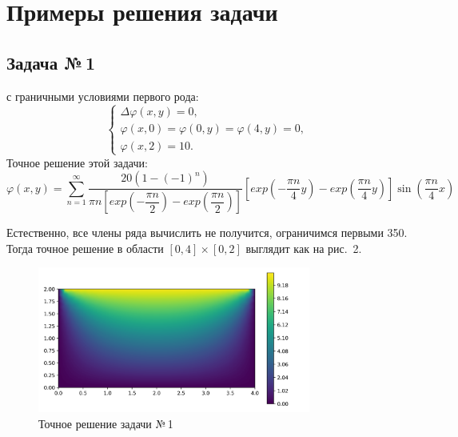 \documentclass[12pt, a4paper]{article}
\begin{document}
		\section{Примеры решения задачи}
		
			\subsection{Задача №\,1}
				
				 с граничными условиями первого рода:
				\begin{equation*}
					\begin{cases}
						\Delta \varphi (x, y)  = 0, \\
						\varphi (x, 0) = \varphi (0, y) = \varphi (4, y) = 0, \\
						\varphi (x, 2) = 10.
					\end{cases}
				\end{equation*}
				Точное решение этой задачи:
				\begin{equation}
					\displaystyle
					\varphi\left(x, y\right) = \sum_{n = 1}^{\infty} \dfrac{20 \left(1 - (-1)^n \right)}{\pi n \left[ exp\left({-\dfrac{\pi n}{2}}\right) - exp\left({\dfrac{\pi n}{2}}\right)  \right]} \left[ exp\left({-\dfrac{\pi n}{4}} y \right) -  exp\left({\dfrac{\pi n}{4}} y \right)  \right] \sin{\left( \dfrac{\pi n}{4} x \right)}
					\label{exact_solution}
				\end{equation}	
				
				Естественно, все члены ряда вычислить не получится, ограничимся первыми 350. Тогда точное решение в области $\left[ 0 , 4\right] \times  \left[ 0 , 2\right]$ выглядит как на рис.~2.
				\begin{figure}[!h]
					\centering
					\includegraphics[width=0.8\textwidth]{rect_dirichlet_only_exact_sol.png}
					\caption{Точное решение задачи №\,1}
					\label{fig:rect_dom_dir_exact}
				\end{figure}
				
\end{document}
